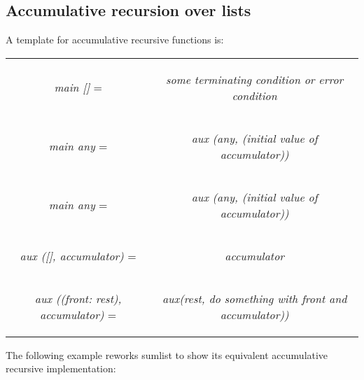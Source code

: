 \documentclass[11pt]{article}
\begin{document}
\subsection{Accumulative recursion over lists}

A template for accumulative recursive functions is:

\begin{center}
\begin{tabular}{c c}

\textit{ main []} = &\begin{flushleft}  \textit{some terminating condition
or error condition} \end{flushleft}  \\

\textit{main any} =
 &\begin{flushleft}\textit{aux (any, (initial value of accumulator))} \end{flushleft}  \\
 
 \textit{main any} =
 &\begin{flushleft}\textit{aux (any, (initial value of accumulator))} \end{flushleft}  \\
 
 \textit{aux ([], accumulator)} =
 &\begin{flushleft}\textit{accumulator} \end{flushleft}  \\
 
  \textit{aux ((front: rest), accumulator)} =
 &\begin{flushleft}\textit{aux(rest, do something with front
and accumulator))} \end{flushleft}  \\
\end{tabular}
\end{center}

The following example reworks sumlist to show its equivalent accumulative recursive
implementation:
\\
\end{document}

